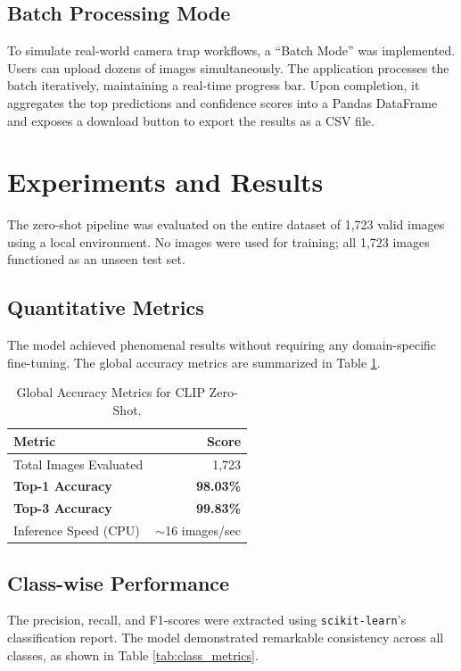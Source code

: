 \documentclass[11pt]{article}
\begin{document}
\subsection{Batch Processing Mode}
To simulate real-world camera trap workflows, a ``Batch Mode'' was implemented. Users can upload dozens of images simultaneously. The application processes the batch iteratively, maintaining a real-time progress bar. Upon completion, it aggregates the top predictions and confidence scores into a Pandas DataFrame and exposes a download button to export the results as a CSV file.

\section{Experiments and Results}

The zero-shot pipeline was evaluated on the entire dataset of 1,723 valid images using a local environment. No images were used for training; all 1,723 images functioned as an unseen test set.

\subsection{Quantitative Metrics}
The model achieved phenomenal results without requiring any domain-specific fine-tuning. The global accuracy metrics are summarized in Table \ref{tab:global_metrics}.

\begin{table}[H]
\centering
\begin{tabular}{@{}lr@{}}
\toprule
\textbf{Metric} & \textbf{Score} \\ \midrule
Total Images Evaluated & 1,723 \\
\textbf{Top-1 Accuracy} & \textbf{98.03\%} \\
\textbf{Top-3 Accuracy} & \textbf{99.83\%} \\ 
Inference Speed (CPU) & $\sim$16 images/sec \\ \bottomrule
\end{tabular}
\caption{Global Accuracy Metrics for CLIP Zero-Shot.}
\label{tab:global_metrics}
\end{table}

\subsection{Class-wise Performance}
The precision, recall, and F1-scores were extracted using \texttt{scikit-learn}'s classification report. The model demonstrated remarkable consistency across all classes, as shown in Table \ref{tab:class_metrics}.
\end{document}
